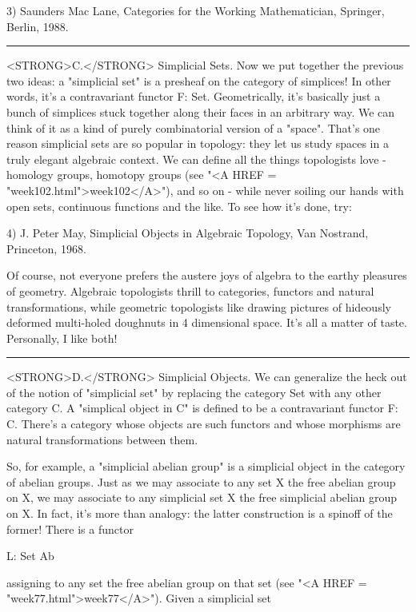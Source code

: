 3) Saunders Mac Lane, Categories for the Working Mathematician,
Springer, Berlin, 1988.
\par\noindent\rule{\textwidth}{0.4pt}
<STRONG>C.</STRONG>  Simplicial Sets.  Now we put together the previous two ideas: a
"simplicial set" is a presheaf on the category of simplices!  In other
words, it's a contravariant functor F: \Delta  \to  Set.  Geometrically,
it's basically just a bunch of simplices stuck together along their
faces in an arbitrary way.  We can think of it as a kind of purely
combinatorial version of a "space".  That's one reason simplicial sets
are so popular in topology: they let us study spaces in a truly elegant
algebraic context.  We can define all the things topologists love -
homology groups, homotopy groups (see "<A HREF = "week102.html">week102</A>"), and so on - while
never soiling our hands with open sets, continuous functions and the
like.  To see how it's done, try:

4) J. Peter May, Simplicial Objects in Algebraic Topology, Van Nostrand,
Princeton, 1968.

Of course, not everyone prefers the austere joys of algebra to the
earthy pleasures of geometry.  Algebraic topologists thrill to
categories, functors and natural transformations, while geometric
topologists like drawing pictures of hideously deformed multi-holed
doughnuts in 4 dimensional space.  It's all a matter of taste.
Personally, I like both!

\par\noindent\rule{\textwidth}{0.4pt}
<STRONG>D.</STRONG>
  Simplicial Objects.  We can generalize the heck out of the notion of
"simplicial set" by replacing the category Set with any other category
C.  A "simplical object in C" is defined to be a contravariant functor
F: \Delta  \to  C.  There's a category whose objects are such functors and
whose morphisms are natural transformations between them.

So, for example, a "simplicial abelian group" is a simplicial object
in the category of abelian groups.   Just as we may associate to any
set X the free abelian group on X, we may associate to any simplicial
set X the free simplicial abelian group on X.  In fact, it's more than 
analogy: the latter construction is a spinoff of the former!  There
is a functor 

                       L: Set \to  Ab

assigning to any set the free abelian group on that set (see "<A HREF = "week77.html">week77</A>").
Given a simplicial set

